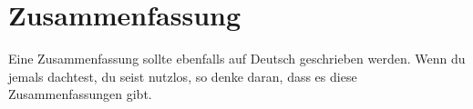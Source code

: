 \chapter{Zusammenfassung}

Eine Zusammenfassung sollte ebenfalls auf Deutsch geschrieben werden. Wenn du jemals dachtest, du seist nutzlos, so denke daran, dass es diese Zusammenfassungen gibt.